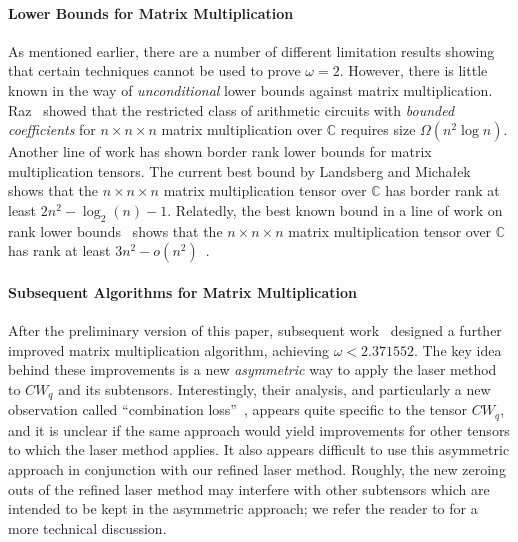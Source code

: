\documentclass{theoretics}
\begin{document}
\paragraph*{Lower Bounds for Matrix Multiplication}

As mentioned earlier, there are a number of different limitation results showing that certain techniques cannot be used to prove $\omega=2$. However, there is little known in the way of \emph{unconditional} lower bounds against matrix multiplication. Raz~\cite{raz2002complexity} showed that the restricted class of arithmetic circuits with \emph{bounded coefficients} for $n \times n \times n$ matrix multiplication over $\mathbb{C}$ requires size $\Omega(n^2 \log n)$. Another line of work \cite{strassen1983rank,lickteig1984note,burgisser2011geometric,landsberg2015new,landsberg20172} has shown border rank lower bounds for matrix multiplication tensors. The current best bound by Landsberg and Micha{\l}ek~\cite{landsberg20172} shows that the $n \times n \times n$ matrix multiplication tensor over $\mathbb{C}$ has border rank at least $2n^2 - \log_2(n) - 1$. Relatedly, the best known bound in a line of work on rank lower bounds~\cite{blaser19995,shpilka2003lower,landsberg2014new} shows that the $n \times n \times n$ matrix multiplication tensor over $\mathbb{C}$ has rank at least $3n^2 - o(n^2)$~\cite{landsberg2014new}.


\paragraph*{Subsequent Algorithms for Matrix Multiplication}

After the preliminary version of this paper, subsequent work~\cite{duan2023faster,williams2024new} designed a further improved matrix multiplication algorithm, achieving $\omega < 2.371552$. The key idea behind these improvements is a new \emph{asymmetric} way to apply the laser method to $CW_q$ and its subtensors. Interestingly, their analysis, and particularly a new observation called ``combination loss''~\cite{duan2023faster}, appears quite specific to the tensor $CW_q$, and it is unclear if the same approach would yield improvements for other tensors to which the laser method applies. It also appears difficult to use this asymmetric approach in conjunction with our refined laser method. Roughly, the new zeroing outs of the refined laser method may interfere with other subtensors which are intended to be kept in the asymmetric approach; we refer the reader to \cite[End of Section 2.2]{williams2024new} for a more technical discussion.
\end{document}

